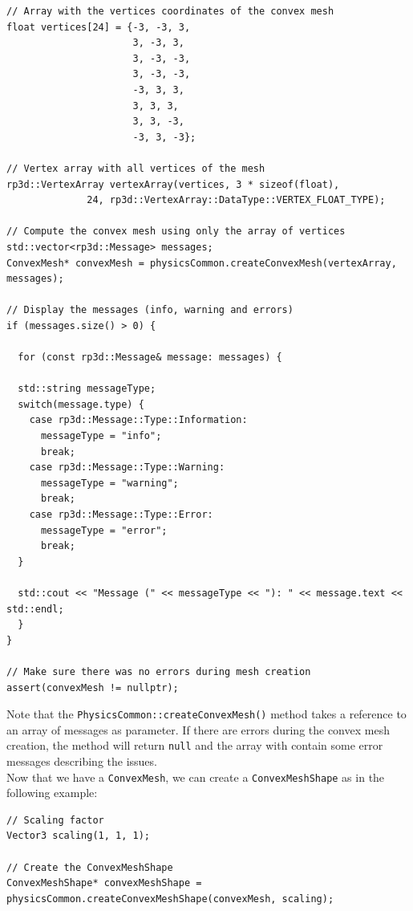 \documentclass[a4paper,12pt]{article}
\begin{document}
    \begin{lstlisting}
// Array with the vertices coordinates of the convex mesh
float vertices[24] = {-3, -3, 3,
                      3, -3, 3,
                      3, -3, -3,
                      3, -3, -3,
                      -3, 3, 3,
                      3, 3, 3,
                      3, 3, -3,
                      -3, 3, -3};

// Vertex array with all vertices of the mesh
rp3d::VertexArray vertexArray(vertices, 3 * sizeof(float),
			  24, rp3d::VertexArray::DataType::VERTEX_FLOAT_TYPE);

// Compute the convex mesh using only the array of vertices
std::vector<rp3d::Message> messages;
ConvexMesh* convexMesh = physicsCommon.createConvexMesh(vertexArray, messages);

// Display the messages (info, warning and errors)
if (messages.size() > 0) {

  for (const rp3d::Message& message: messages) {

  std::string messageType;
  switch(message.type) {
    case rp3d::Message::Type::Information:
      messageType = "info";
      break;
    case rp3d::Message::Type::Warning:
      messageType = "warning";
      break;
    case rp3d::Message::Type::Error:
      messageType = "error";
      break;
  }

  std::cout << "Message (" << messageType << "): " << message.text << std::endl;
  }
}

// Make sure there was no errors during mesh creation
assert(convexMesh != nullptr);

    \end{lstlisting}

    \vspace{0.6cm}

    Note that the \texttt{PhysicsCommon::createConvexMesh()} method takes a reference to an array of messages as parameter. If there are errors
    during the convex mesh creation, the method will return \texttt{null} and the array with contain some error messages describing the issues. \\

    Now that we have a \texttt{ConvexMesh}, we can create a \texttt{ConvexMeshShape} as in the following example: \\

    \begin{lstlisting}
// Scaling factor
Vector3 scaling(1, 1, 1);

// Create the ConvexMeshShape
ConvexMeshShape* convexMeshShape = physicsCommon.createConvexMeshShape(convexMesh, scaling);
    \end{lstlisting}
\end{document}
